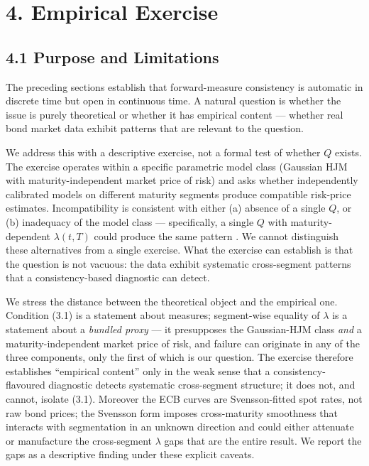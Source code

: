 \documentclass[
]{article}
\begin{document}
\section{4. Empirical Exercise}\label{empirical-exercise}

\subsection{4.1 Purpose and Limitations}\label{purpose-and-limitations}

The preceding sections establish that forward-measure consistency is
automatic in discrete time but open in continuous time. A natural
question is whether the issue is purely theoretical or whether it has
empirical content --- whether real bond market data exhibit patterns
that are relevant to the question.

We address this with a descriptive exercise, not a formal test of
whether \(Q\) exists. The exercise operates within a specific parametric
model class (Gaussian HJM with maturity-independent market price of
risk) and asks whether independently calibrated models on different
maturity segments produce compatible risk-price estimates.
Incompatibility is consistent with either (a) absence of a single \(Q\),
or (b) inadequacy of the model class --- specifically, a single \(Q\)
with maturity-dependent \(\lambda(t,T)\) could produce the same pattern
\citep{Duffee2002,JoslinSingletonZhu2011}. We cannot distinguish
these alternatives from a single exercise. What the exercise can
establish is that the question is not vacuous: the data exhibit
systematic cross-segment patterns that a consistency-based diagnostic
can detect.

We stress the distance between the theoretical object and the empirical
one. Condition (3.1) is a statement about measures; segment-wise
equality of \(\lambda\) is a statement about a \emph{bundled proxy} ---
it presupposes the Gaussian-HJM class \emph{and} a maturity-independent
market price of risk, and failure can originate in any of the three
components, only the first of which is our question. The exercise
therefore establishes ``empirical content'' only in the weak sense that
a consistency-flavoured diagnostic detects systematic cross-segment
structure; it does not, and cannot, isolate (3.1). Moreover the ECB
curves are Svensson-fitted spot rates, not raw bond prices; the Svensson
form imposes cross-maturity smoothness that interacts with segmentation
in an unknown direction and could either attenuate or manufacture the
cross-segment \(\lambda\) gaps that are the entire result. We report the
gaps as a descriptive finding under these explicit caveats.
\end{document}
